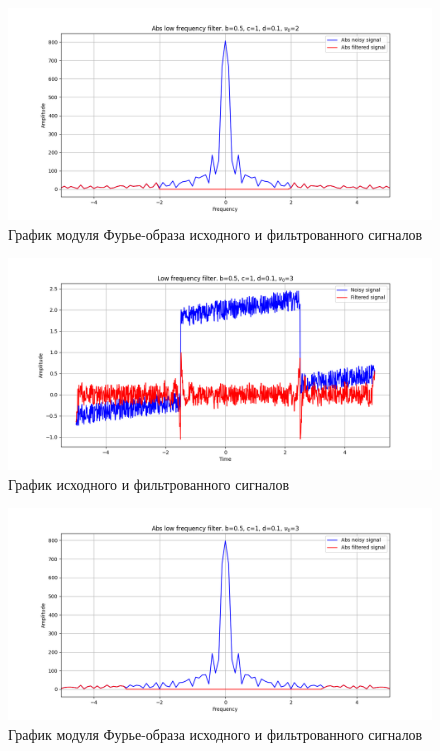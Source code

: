 \documentclass[a4paper, 12pt]{article}
\begin{document}
    \begin{figure}[!htb]
        \centering
        \includegraphics[scale=0.485]{11_abs_u_U_nolow.png}
        \captionsetup{skip=0pt}
        \caption{График модуля Фурье-образа исходного и фильтрованного сигналов}
        \label{fig:fig48}
    \end{figure}
    \begin{figure}[!htb]
        \centering
        \includegraphics[scale=0.485]{12_u_flt_u_nolow.png}
        \captionsetup{skip=0pt}
        \caption{График исходного и фильтрованного сигналов}
        \label{fig:fig49}
    \end{figure}
    \begin{figure}[!htb]
        \centering
        \includegraphics[scale=0.485]{12_abs_u_U_nolow.png}
        \captionsetup{skip=0pt}
        \caption{График модуля Фурье-образа исходного и фильтрованного сигналов}
        \label{fig:fig50}
    \end{figure}
\end{document}
